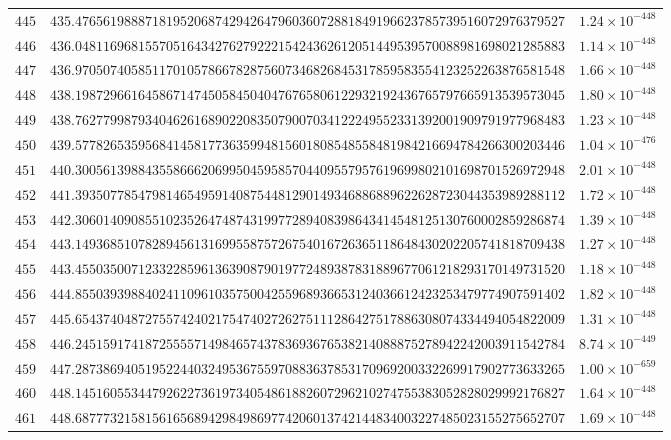 \documentclass[12pt,reqno]{amsart}
\theoremstyle{remark}
\begin{document}
\begin{longtable}{clc}
$445$ & $435.4765619888718195206874294264796036072881849196623785739516072976379527$ & $1.24\times 10^{-448}$ \\
$446$ & $436.0481169681557051643427627922215424362612051449539570088981698021285883$ & $1.14\times 10^{-448}$ \\
$447$ & $436.9705074058511701057866782875607346826845317859583554123252263876581548$ & $1.66\times 10^{-448}$ \\
$448$ & $438.1987296616458671474505845040476765806122932192436765797665913539573045$ & $1.80\times 10^{-448}$ \\
$449$ & $438.7627799879340462616890220835079007034122249552331392001909791977968483$ & $1.23\times 10^{-448}$ \\
$450$ & $439.5778265359568414581773635994815601808548558481984216694784266300203446$ & $1.04\times 10^{-476}$ \\
$451$ & $440.3005613988435586662069950459585704409557957619699802101698701526972948$ & $2.01\times 10^{-448}$ \\
$452$ & $441.3935077854798146549591408754481290149346886889622628723044353989288112$ & $1.72\times 10^{-448}$ \\
$453$ & $442.3060140908551023526474874319977289408398643414548125130760002859286874$ & $1.39\times 10^{-448}$ \\
$454$ & $443.1493685107828945613169955875726754016726365118648430202205741818709438$ & $1.27\times 10^{-448}$ \\
$455$ & $443.4550350071233228596136390879019772489387831889677061218293170149731520$ & $1.18\times 10^{-448}$ \\
$456$ & $444.8550393988402411096103575004255968936653124036612423253479774907591402$ & $1.82\times 10^{-448}$ \\
$457$ & $445.6543740487275574240217547402726275111286427517886308074334494054822009$ & $1.31\times 10^{-448}$ \\
$458$ & $446.2451591741872555571498465743783693676538214088875278942242003911542784$ & $8.74\times 10^{-449}$ \\
$459$ & $447.2873869405195224403249536755970883637853170969200332269917902773633265$ & $1.00\times 10^{-659}$ \\
$460$ & $448.1451605534479262273619734054861882607296210274755383052828029992176827$ & $1.64\times 10^{-448}$ \\
$461$ & $448.6877732158156165689429849869774206013742144834003227485023155275652707$ & $1.69\times 10^{-448}$ \\

\end{longtable}
\end{document}
